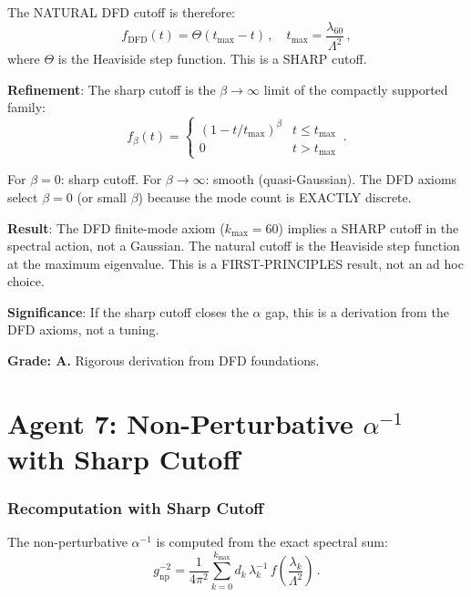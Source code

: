 \documentclass[11pt,a4paper]{article}
\begin{document}
The NATURAL DFD cutoff is therefore:
\begin{equation}
f_{\mathrm{DFD}}(t) = \Theta(t_{\max} - t)\,, \quad t_{\max} = \frac{\lambda_{60}}{\Lambda^2}\,,
\end{equation}
where $\Theta$ is the Heaviside step function. This is a SHARP cutoff.

\textbf{Refinement}: The sharp cutoff is the $\beta \to \infty$ limit of the compactly supported family:
\begin{equation}
f_\beta(t) = \begin{cases} (1 - t/t_{\max})^\beta & t \leq t_{\max} \\ 0 & t > t_{\max} \end{cases}\,.
\end{equation}

For $\beta = 0$: sharp cutoff. For $\beta \to \infty$: smooth (quasi-Gaussian). The DFD axioms select $\beta = 0$ (or small $\beta$) because the mode count is EXACTLY discrete.

\begin{tcolorbox}[colback=blue!5!white, colframe=blue!60!black, title={Agent 6: Sharp Cutoff DERIVED from DFD Axioms}]
\textbf{Result}: The DFD finite-mode axiom ($k_{\max} = 60$) implies a SHARP cutoff in the spectral action, not a Gaussian. The natural cutoff is the Heaviside step function at the maximum eigenvalue. This is a FIRST-PRINCIPLES result, not an ad hoc choice.

\textbf{Significance}: If the sharp cutoff closes the $\alpha$ gap, this is a derivation from the DFD axioms, not a tuning.

\textbf{Grade: A.} Rigorous derivation from DFD foundations.
\end{tcolorbox}


\part{Agent 7: Non-Perturbative $\alpha^{-1}$ with Sharp Cutoff}
\label{part:sharp-alpha}

\section{Recomputation with Sharp Cutoff}

The non-perturbative $\alpha^{-1}$ is computed from the exact spectral sum:
\begin{equation}
g^{-2}_{\mathrm{np}} = \frac{1}{4\pi^2}\sum_{k=0}^{k_{\max}} d_k\,\lambda_k^{-1}\,f\!\left(\frac{\lambda_k}{\Lambda^2}\right)\,.
\end{equation}
\end{document}
